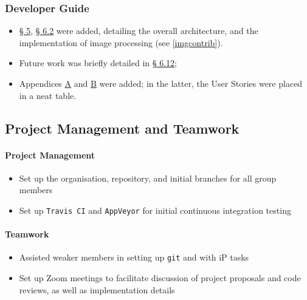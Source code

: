 \documentclass[11pt,british]{article}
\begin{document}
\subsubsection{Developer Guide}
\begin{itemize}
	\item \href{https://ay1920s2-cs2103t-w12-4.github.io/main/DeveloperGuide.html#design}{\S{} 5}, \href{https://ay1920s2-cs2103t-w12-4.github.io/main/DeveloperGuide.html#image-management-done-by-sharadh-rajaraman}{\S{} 6.2} were added, detailing the overall architecture, and the implementation of image processing (see \cref{imgcontrib}).
	\item Future work was briefly detailed in \href{https://ay1920s2-cs2103t-w12-4.github.io/main/DeveloperGuide.html#Implementation-Future}{\S{} 6.12};
	\item Appendices \href{https://ay1920s2-cs2103t-w12-4.github.io/main/DeveloperGuide.html#product-scope-done-by-zain-alam-sharadh-rajaraman}{A} and \href{https://ay1920s2-cs2103t-w12-4.github.io/main/DeveloperGuide.html#user-stories-done-by-sharadh-rajaraman-and-adarsh-chugani}{B} were added; in the latter, the User Stories were placed in a neat table.
\end{itemize}

\subsection{Project Management and Teamwork}
\paragraph{Project Management}
\begin{itemize}
	\item Set up the organisation, repository, and initial branches for all group members 
	\item Set up \texttt{Travis CI} and \texttt{AppVeyor} for initial continuous integration testing
\end{itemize}

\paragraph{Teamwork}
\begin{itemize}
	\item Assisted weaker members in setting up \texttt{git} and with iP tasks
	\item Set up Zoom meetings to facilitate discussion of project proposals and code reviews, as well as implementation details
\end{itemize}
\end{document}
